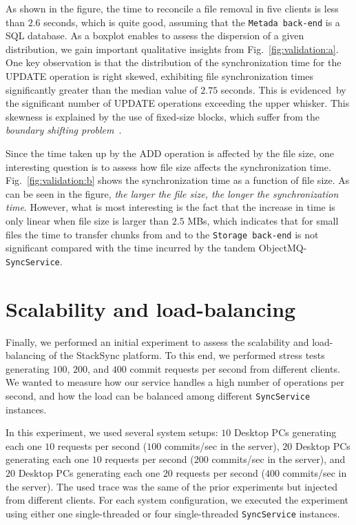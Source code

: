 As shown in the figure, the time to reconcile
a file removal in five clients is less than $2.6$ seconds, which is quite good, assuming that the
\texttt{Metada back-end} is a SQL database.
As a boxplot enables to assess the dispersion of a given distribution, 
we gain important qualitative
insights from Fig.~\ref{fig:validation:a}. One key observation is that the distribution of the
synchronization time for the UPDATE operation is right skewed, exhibiting file synchronization times
significantly greater than the median value of $2.75$ seconds. This is evidenced~by
the significant number of UPDATE operations exceeding the upper whisker. This skewness is explained
by the use of fixed-size blocks, which suffer from the \textit{boundary shifting problem}~\cite{Eshghi05}.

Since the time taken up by the ADD operation is affected by the file size, one interesting question
is to assess how file size affects the synchronization time. Fig.~\ref{fig:validation:b} shows the synchronization
time as a function of file size. As can be seen in the figure, \textit{the larger the file size, the longer
the synchronization time}. However, what is most interesting is the fact that the increase in time
is only linear when file size is larger than $2.5$ MBs, which indicates that for small files the
time to transfer chunks from and to the \texttt{Storage back-end} is not significant compared
with the time incurred by the tandem ObjectMQ-\texttt{SyncService}. 

\section{Scalability and load-balancing}

Finally, we performed an initial experiment to assess the scalability and load-balancing of 
the StackSync platform. To this end, we performed stress tests generating $100$, $200$, and
$400$ commit requests per second from different clients. We wanted to measure how our service
handles a high number of operations per second, and how the load can be balanced among different
\texttt{SyncService} instances.

In this experiment, we used several system setups: $10$ Desktop PCs generating each one $10$ 
requests per second ($100$ commits/sec in the server), $20$ Desktop PCs generating each one
$10$ requests per second ($200$ commits/sec in the server), and $20$ Desktop PCs generating
each one $20$ requests per second ($400$ commits/sec in the server). 
The used trace was the same of the prior experiments but injected from different clients.
For each system configuration, we executed the experiment using either one single-threaded or four single-threaded 
\texttt{SyncService} instances. 

